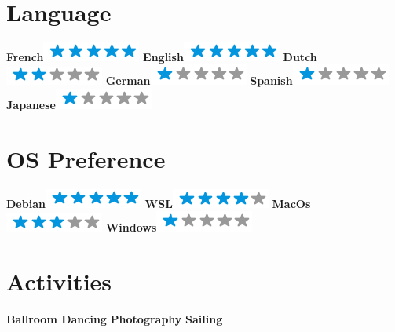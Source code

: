 \begin{aside}
	~
	\makecvsideheader%
	\section{Language}
	\textbf{French}\includegraphics[scale=0.40]{img/5stars.png}
	\textbf{English}\includegraphics[scale=0.40]{img/5stars.png}
	\textbf{Dutch}\includegraphics[scale=0.40]{img/2stars.png}
	\textbf{German}\includegraphics[scale=0.40]{img/1stars.png}
	\textbf{Spanish}\includegraphics[scale=0.40]{img/1stars.png}
	\textbf{Japanese}\includegraphics[scale=0.40]{img/1stars.png}
	~
	\section{OS Preference}
	\textbf{Debian}\includegraphics[scale=0.40]{img/5stars.png}
	\textbf{WSL}\includegraphics[scale=0.40]{img/4stars.png}
	\textbf{MacOs}\includegraphics[scale=0.40]{img/3stars.png}
	\textbf{Windows}\includegraphics[scale=0.40]{img/1stars.png}
	~
	\section{Activities}
	\textbf{Ballroom Dancing}
	\textbf{Photography}
	\textbf{Sailing}
\end{aside}
